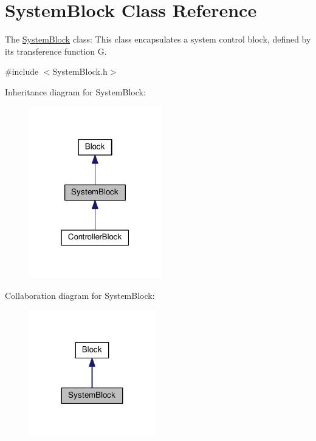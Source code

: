 \hypertarget{classSystemBlock}{}\section{System\+Block Class Reference}
\label{classSystemBlock}


The \hyperlink{classSystemBlock}{System\+Block} class\+: This class encapsulates a system control block, defined by its transference function G. 




{\ttfamily \#include $<$System\+Block.\+h$>$}



Inheritance diagram for System\+Block\+:\nopagebreak
\begin{figure}[H]
\begin{center}
\leavevmode
\includegraphics[width=163pt]{classSystemBlock__inherit__graph}
\end{center}
\end{figure}


Collaboration diagram for System\+Block\+:\nopagebreak
\begin{figure}[H]
\begin{center}
\leavevmode
\includegraphics[width=155pt]{classSystemBlock__coll__graph}
\end{center}
\end{figure}
